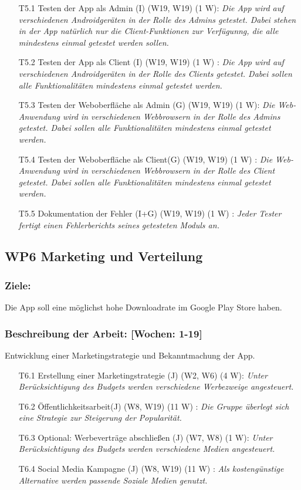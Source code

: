 \documentclass{scrreprt}
\begin{document}
\begin{enumerate}
\item [T5.1] Testen der App als Admin (I) (W19, W19) (1 W): \emph{ Die App wird auf verschiedenen Androidgeräten in der Rolle des Admins getestet. Dabei stehen in der App natürlich nur die Client-Funktionen zur Verfügunng, die alle mindestens einmal getestet werden sollen.}
\item [T5.2] Testen der App als Client (I) (W19, W19) (1 W) : \emph{ Die App wird auf verschiedenen Androidgeräten in der Rolle des Clients getestet. Dabei sollen alle Funktionalitäten mindestens einmal getestet werden.}
\item [T5.3] Testen der Weboberfläche als Admin (G) (W19, W19) (1 W): \emph{ Die Web-Anwendung wird in verschiedenen Webbrowsern in der Rolle des Admins getestet. Dabei sollen alle Funktionalitäten mindestens einmal getestet werden.}
\item [T5.4] Testen der Weboberfläche als Client(G) (W19, W19) (1 W) : \emph{ Die Web-Anwendung wird in verschiedenen Webbrowsern in der Rolle des Client getestet. Dabei sollen alle Funktionalitäten mindestens einmal getestet werden.}
\item [T5.5] Dokumentation der Fehler (I+G) (W19, W19) (1 W) : \emph{Jeder Tester fertigt einen Fehlerberichts seines getesteten Moduls an.}
\end{enumerate}

\subsection*{WP6 Marketing und Verteilung}

\subsubsection{Ziele:} Die App soll eine möglichst hohe Downloadrate im Google Play Store haben.
\subsubsection{Beschreibung der Arbeit: [Wochen: 1-19]} Entwicklung einer Marketingstrategie und Bekanntmachung der App.

\begin{enumerate}
\item [T6.1] Erstellung einer Marketingstrategie (J) (W2, W6) (4 W): \emph{Unter Berücksichtigung des Budgets werden verschiedene Werbezweige angesteuert.}
\item [T6.2] Öffentlichkeitsarbeit(J) (W8, W19) (11 W) : \emph{ Die Gruppe überlegt sich eine Strategie zur Steigerung der Popularität.}
\item [T6.3] Optional: Werbeverträge abschließen (J) (W7, W8) (1 W): \emph{ Unter Berücksichtigung des Budgets werden verschiedene Medien angesteuert.}
\item [T6.4] Social Media Kampagne (J) (W8, W19) (11 W) : \emph{ Als kostengünstige Alternative werden passende Soziale Medien genutzt.}
\end{enumerate}
\end{document}
